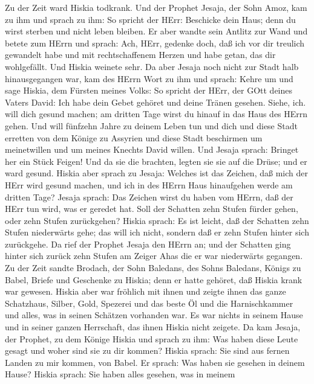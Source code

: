  Zu der Zeit ward Hiskia todkrank. Und der Prophet Jesaja,
der Sohn Amoz, kam zu ihm und sprach zu ihm: So spricht der HErr:
Beschicke dein Haus; denn du wirst sterben und nicht leben bleiben.
 Er aber wandte sein Antlitz zur Wand und betete zum HErrn
und sprach:  Ach, HErr, gedenke doch, daß ich vor dir
treulich gewandelt habe und mit rechtschaffenem Herzen und habe getan,
das dir wohlgefällt. Und Hiskia weinete sehr.  Da aber
Jesaja noch nicht zur Stadt halb hinausgegangen war, kam des HErrn Wort
zu ihm und sprach:  Kehre um und sage Hiskia, dem Fürsten
meines Volks: So spricht der HErr, der GOtt deines Vaters David: Ich
habe dein Gebet gehöret und deine Tränen gesehen. Siehe, ich. will dich
gesund machen; am dritten Tage wirst du hinauf in das Haus des HErrn
gehen.  Und will fünfzehn Jahre zu deinem Leben tun und dich
und diese Stadt erretten von dem Könige zu Assyrien und diese Stadt
beschirmen um meinetwillen und um meines Knechts David willen.
 Und Jesaja sprach: Bringet her ein Stück Feigen! Und da sie
die brachten, legten sie sie auf die Drüse; und er ward gesund.
 Hiskia aber sprach zu Jesaja: Welches ist das Zeichen, daß
mich der HErr wird gesund machen, und ich in des HErrn Haus hinaufgehen
werde am dritten Tage?  Jesaja sprach: Das Zeichen wirst du
haben vom HErrn, daß der HErr tun wird, was er geredet hat. Soll der
Schatten zehn Stufen fürder gehen, oder zehn Stufen zurückgehen?
 Hiskia sprach: Es ist leicht, daß der Schatten zehn Stufen
niederwärts gehe; das will ich nicht, sondern daß er zehn Stufen hinter
sich zurückgehe.  Da rief der Prophet Jesaja den HErrn an;
und der Schatten ging hinter sich zurück zehn Stufen am Zeiger Ahas die
er war niederwärts gegangen.  Zu der Zeit sandte Brodach,
der Sohn Baledans, des Sohns Baledans, Königs zu Babel, Briefe und
Geschenke zu Hiskia; denn er hatte gehöret, daß Hiskia krank war
gewesen.  Hiskia aber war fröhlich mit ihnen und zeigte
ihnen das ganze Schatzhaus, Silber, Gold, Spezerei und das beste Öl und
die Harnischkammer und alles, was in seinen Schätzen vorhanden war. Es
war nichts in seinem Hause und in seiner ganzen Herrschaft, das ihnen
Hiskia nicht zeigete.  Da kam Jesaja, der Prophet, zu dem
Könige Hiskia und sprach zu ihm: Was haben diese Leute gesagt und woher
sind sie zu dir kommen? Hiskia sprach: Sie sind aus fernen Landen zu mir
kommen, von Babel.  Er sprach: Was haben sie gesehen in
deinem Hause? Hiskia sprach: Sie haben alles gesehen, was in meinem
